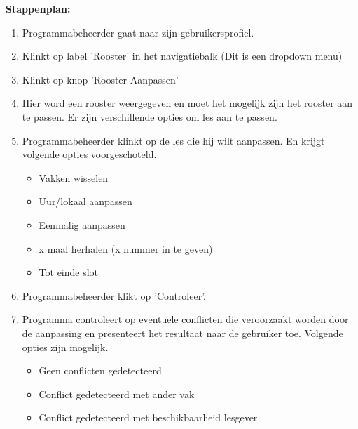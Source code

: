 \textbf{Stappenplan:}
	\begin{enumerate}
	\item Programmabeheerder gaat naar zijn gebruikersprofiel.
	\item Klinkt op label 'Rooster' in het navigatiebalk (Dit is een dropdown menu)
	\item Klinkt op knop 'Rooster Aanpassen'
	\item Hier word een rooster weergegeven en moet het mogelijk zijn het rooster aan te passen. Er zijn verschillende opties om les aan te passen.
	\item Programmabeheerder klinkt op de les die hij wilt aanpassen. En krijgt volgende opties voorgeschoteld.
		\begin{itemize}
		\item Vakken wisselen
		\item Uur/lokaal aanpassen
		\item Eenmalig aanpassen 
		\item x maal herhalen (x nummer in te geven) 
		\item Tot einde slot 
		\end{itemize}
	\item Programmabeheerder klikt op 'Controleer'.
	\item Programma controleert op eventuele conflicten die veroorzaakt worden door de aanpassing en presenteert het resultaat naar de gebruiker toe. Volgende opties zijn mogelijk.
		\begin{itemize}
		\item Geen conflicten gedetecteerd
		\item Conflict gedetecteerd met ander vak 
		\item Conflict gedetecteerd met beschikbaarheid lesgever
		\end{itemize}
	
	\end{enumerate}	
		
